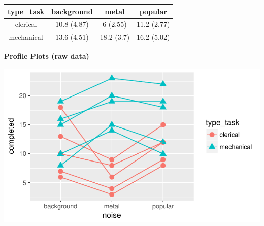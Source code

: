 \documentclass[]{article}
\begin{document}
\begin{longtable}[]{@{}cccc@{}}
\toprule
\begin{minipage}[b]{0.16\columnwidth}\centering\strut
type\_task\strut
\end{minipage} & \begin{minipage}[b]{0.17\columnwidth}\centering\strut
background\strut
\end{minipage} & \begin{minipage}[b]{0.16\columnwidth}\centering\strut
metal\strut
\end{minipage} & \begin{minipage}[b]{0.16\columnwidth}\centering\strut
popular\strut
\end{minipage}\tabularnewline
\midrule
\endhead
\begin{minipage}[t]{0.16\columnwidth}\centering\strut
clerical\strut
\end{minipage} & \begin{minipage}[t]{0.17\columnwidth}\centering\strut
10.8 (4.87)\strut
\end{minipage} & \begin{minipage}[t]{0.16\columnwidth}\centering\strut
6 (2.55)\strut
\end{minipage} & \begin{minipage}[t]{0.16\columnwidth}\centering\strut
11.2 (2.77)\strut
\end{minipage}\tabularnewline
\begin{minipage}[t]{0.16\columnwidth}\centering\strut
mechanical\strut
\end{minipage} & \begin{minipage}[t]{0.17\columnwidth}\centering\strut
13.6 (4.51)\strut
\end{minipage} & \begin{minipage}[t]{0.16\columnwidth}\centering\strut
18.2 (3.7)\strut
\end{minipage} & \begin{minipage}[t]{0.16\columnwidth}\centering\strut
16.2 (5.02)\strut
\end{minipage}\tabularnewline
\bottomrule
\end{longtable}

\textbf{Profile Plots (raw data)}

\begin{center}\includegraphics{Unit_5_assignment_SKELETON_R__spr18__files/figure-latex/unnamed-chunk-52-1} \end{center}
\end{document}
